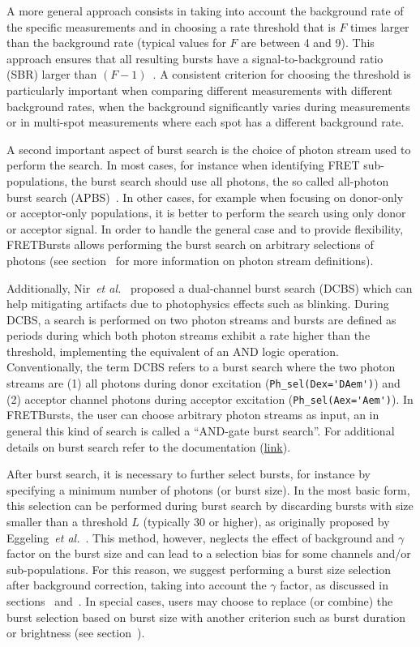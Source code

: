 \documentclass[10pt,letterpaper]{article}
\begin{document}
A more general approach consists in taking into account the background rate of
the specific measurements and in choosing a rate threshold that is $F$ times
larger than the background rate (typical values for $F$ are between 4 and 9). 
This approach ensures that all resulting bursts
have a signal-to-background ratio (SBR) larger than
$(F-1)$~\cite{Michalet_2012}. A consistent criterion for choosing the threshold is
particularly important when comparing different measurements with different background
rates, when the background significantly varies during measurements or in
multi-spot measurements where each spot has a different background rate.

A second important aspect of burst search is the choice of photon stream used
to perform the search.
In most cases, for instance when identifying FRET sub-populations,
the burst search should use all photons, the so called
all-photon burst search (APBS)~\cite{Eggeling_1998,Fries_1998,Nir_2006}.
In other cases, for example when focusing on
donor-only or acceptor-only populations, it is better to perform 
the search using only donor or acceptor signal.
In order to handle the general case and to provide flexibility,
FRETBursts allows performing the burst search on arbitrary selections of photons
(see section~ for more information on photon stream definitions).

Additionally, Nir~\textit{et al.}~\cite{Nir_2006} proposed a dual-channel 
burst search (DCBS) 
which can help mitigating artifacts due to photophysics effects such as blinking.
During DCBS, a search is performed on two photon streams
and bursts are defined as periods during which both photon streams 
exhibit a rate higher than
the threshold, implementing the equivalent of an AND logic operation.
Conventionally, the term DCBS refers to a burst search where the two photon streams
are (1) all photons during donor excitation (\verb|Ph_sel(Dex='DAem')|) and
(2) acceptor channel photons during acceptor excitation (\verb|Ph_sel(Aex='Aem')|).
In FRETBursts, the user can choose arbitrary photon streams as input, an in general
this kind of search is called a ``AND-gate burst search''.
For additional details on burst search refer to the documentation
(\href{http://fretbursts.readthedocs.io/en/latest/burstsearch.html}{link}).

After burst search, it is necessary to further select
bursts, for instance by specifying a minimum number of photons (or burst size). In the most
basic form, this selection can be performed during burst search by discarding
bursts with size smaller than a threshold $L$ (typically 30 or higher), 
as originally proposed by
Eggeling~\textit{et al.}~\cite{Eggeling_1998}.
This method, however, neglects the effect
of background and $\gamma$ factor on the burst size and can lead to a selection
bias for some channels and/or sub-populations.
For this reason, we suggest performing a burst size selection after background
correction, taking into account the $\gamma$ factor, as discussed in
sections~ and~.
In special cases, users may choose to replace (or combine)
the burst selection based on burst size
with another criterion such as burst duration or brightness (see section~).
\end{document}
